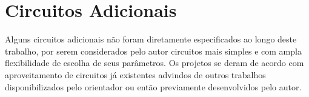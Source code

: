 \section{Circuitos Adicionais}
Alguns circuitos adicionais n\~ao foram diretamente especificados ao longo deste trabalho, por serem considerados pelo autor circuitos mais simples e com ampla flexibilidade de escolha de seus par\^ametros. Os projetos se deram de acordo com aproveitamento de circuitos j\'a existentes advindos de outros trabalhos disponibilizados pelo orientador ou ent\~ao previamente desenvolvidos pelo autor.








